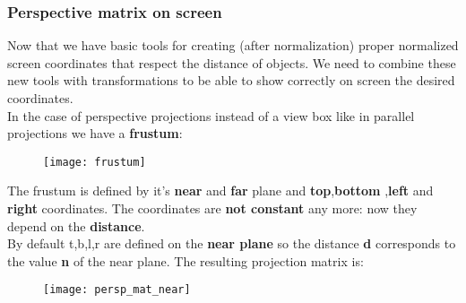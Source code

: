 \subsubsection{Perspective matrix on screen}
Now that we have basic tools for creating (after normalization) proper normalized screen coordinates that respect the distance of objects. We need to combine these new tools with transformations to be able to show correctly on screen the desired coordinates.\\
In the case of perspective projections instead of a view box like in parallel projections we have a \textbf{frustum}:
\begin{figure}[H]
 \centering
  \texttt{[image: frustum]}
\end{figure}
The frustum is defined by it's \textbf{near} and \textbf{far} plane and \textbf{top},\textbf{bottom} ,\textbf{left} and \textbf{right} coordinates.
The coordinates are \textbf{not constant} any more: now they depend on the \textbf{distance}.\\
By default t,b,l,r are defined on the \textbf{near plane} so the distance \textbf{d} corresponds to the value \textbf{n} of the near plane. The resulting projection matrix is:
\begin{figure}[H]
 \centering
  \texttt{[image: persp\_mat\_near]}
\end{figure}
